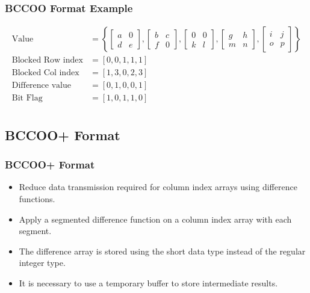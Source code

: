 \begin{frame}
	\frametitle{BCCOO Format Example}
	
\begin{align*}
	\text{Value} &= \left \{ \begin{bmatrix}
	a & 0\\ 
	d & e
	\end{bmatrix}, 
	\begin{bmatrix}
	b & c\\ 
	f & 0
	\end{bmatrix}, 
	\begin{bmatrix}
	0 & 0\\ 
	k & l
	\end{bmatrix}, 
	\begin{bmatrix}
	g & h\\ 
	m & n
	\end{bmatrix}, 
	\begin{bmatrix}
	i & j\\ 
	o & p
	\end{bmatrix}
	\right \} \\
	\text{Blocked Row index} &= [0, 0, 1, 1, 1] \\
	\text{Blocked Col index} &= [1, 3, 0, 2, 3] \\
	\text{Difference value}  &= [0, 1, 0, 0, 1] \\
	\text{Bit Flag}			 &= [1, 0, 1, 1, 0]	\\
\end{align*}

\end{frame}

\subsection{BCCOO+ Format}
\begin{frame}
	\frametitle{BCCOO+ Format}
	\begin{itemize}
		\item Reduce data transmission required for column index arrays
			using difference functions.
		\item Apply a segmented difference function on a column index array
			with each segment.
		\item The difference array is stored using the short data type 
			instead of the regular integer type.
		\item It is necessary to use a temporary buffer to store 
			intermediate results.
	\end{itemize}
\end{frame}

